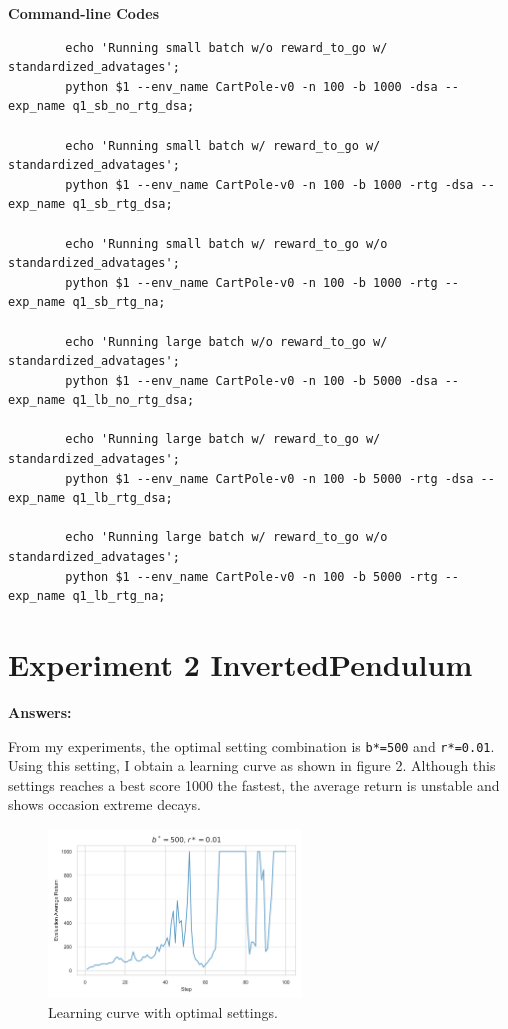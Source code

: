 \documentclass[10pt, letterpaper]{article}
\begin{document}
    \textbf{Command-line Codes}
    \begin{lstlisting}
        echo 'Running small batch w/o reward_to_go w/ standardized_advatages';
        python $1 --env_name CartPole-v0 -n 100 -b 1000 -dsa --exp_name q1_sb_no_rtg_dsa;

        echo 'Running small batch w/ reward_to_go w/ standardized_advatages'; 
        python $1 --env_name CartPole-v0 -n 100 -b 1000 -rtg -dsa --exp_name q1_sb_rtg_dsa;

        echo 'Running small batch w/ reward_to_go w/o standardized_advatages';
        python $1 --env_name CartPole-v0 -n 100 -b 1000 -rtg --exp_name q1_sb_rtg_na;

        echo 'Running large batch w/o reward_to_go w/ standardized_advatages';
        python $1 --env_name CartPole-v0 -n 100 -b 5000 -dsa --exp_name q1_lb_no_rtg_dsa;

        echo 'Running large batch w/ reward_to_go w/ standardized_advatages'; 
        python $1 --env_name CartPole-v0 -n 100 -b 5000 -rtg -dsa --exp_name q1_lb_rtg_dsa;

        echo 'Running large batch w/ reward_to_go w/o standardized_advatages';
        python $1 --env_name CartPole-v0 -n 100 -b 5000 -rtg --exp_name q1_lb_rtg_na;
    \end{lstlisting}

    \section*{Experiment 2 InvertedPendulum}

    \textbf{Answers:}
    
    From my experiments, the optimal setting combination is \texttt{b*=500} and \texttt{r*=0.01}. Using this setting, I obtain a learning curve as shown in figure 2. Although this settings reaches a best score 1000 the fastest, the average return is unstable and shows occasion extreme decays.
    
    \begin{figure}[thbp]
        \centering
        \includegraphics[width=0.6\textwidth]{exp_02.png}
        \caption{Learning curve with optimal settings.}
        \label{fig:2}
    \end{figure}
\end{document}
